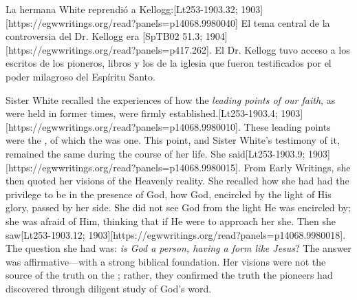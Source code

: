 La hermana White reprendió a Kellogg:[Lt253-1903.32; 1903][https://egwwritings.org/read?panels=p14068.9980040] El tema central de la controversia del Dr. Kellogg era [SpTB02 51.3; 1904][https://egwwritings.org/read?panels=p417.262]. El Dr. Kellogg tuvo acceso a los escritos de los pioneros, libros y los  de la iglesia que fueron testificados por el poder milagroso del Espíritu Santo.


Sister White recalled the experiences of how the \textit{leading points of our faith}, as were held in former times, were firmly established.[Lt253-1903.4; 1903][https://egwwritings.org/read?panels=p14068.9980010]. These leading points were the , of which the  was one. This point, and Sister White’s testimony of it, remained the same during the course of her life.  She said[Lt253-1903.9; 1903][https://egwwritings.org/read?panels=p14068.9980015]. From Early Writings, she then quoted her visions of the Heavenly reality. She recalled how she had had the privilege to be in the presence of God, how God, encircled by the light of His glory, passed by her side. She did not see God from the light He was encircled by; she was afraid of Him, thinking that if He were to approach her she. Then she saw[Lt253-1903.12; 1903][https://egwwritings.org/read?panels=p14068.9980018]. The question she had was: \textit{is God a person, having a form like Jesus}? The answer was affirmative—with a strong biblical foundation. Her visions were not the source of the truth on the ; rather, they confirmed the truth the pioneers had discovered through diligent study of God’s word.



